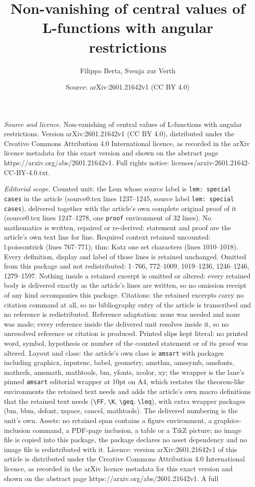 \documentclass[10pt,a4paper]{amsart}
\title[Non-vanishing of central values of L-functions with angular ]{Non-vanishing of central values of L-functions with angular restrictions}
\author{Filippo Berta, Svenja zur Verth}
\date{Source: arXiv:2601.21642v1 (CC BY 4.0)}
\begin{document}
\maketitle

\noindent\emph{Source and licence.} Non-vanishing of central values of L-functions with angular restrictions. Version arXiv:2601.21642v1 (CC BY 4.0), distributed under the Creative Commons Attribution 4.0 International licence, as recorded in the arXiv licence metadata for this exact version and shown on the abstract page https://arxiv.org/abs/2601.21642v1. Full rights notice: licenses/arxiv-2601.21642-CC-BY-4.0.txt.\par\smallskip

\noindent\textit{Editorial scope.} Counted unit: the Lem whose source label is \texttt{lem: special cases} in the article (source0.tex lines 1237--1245, source label \texttt{lem: special cases}), delivered together with the article's own complete original proof of it (source0.tex lines 1247--1278, one \texttt{proof} environment of 32 lines). No mathematics is written, repaired or re-derived: statement and proof are the article's own text line for line. Required context retained uncounted: l:poissontrick (lines 767--771); thm: Katz one set characters (lines 1010--1018). Every definition, display and label of those lines is retained unchanged. Omitted from this package and not redistributed: 1--766, 772--1009, 1019--1236, 1246--1246, 1279--1597. Nothing inside a retained excerpt is omitted or altered: every retained body is delivered exactly as the article's lines are written, so no omission receipt of any kind accompanies this package. Citations: the retained excerpts carry no citation command at all, so no bibliography entry of the article is transcribed and no reference is redistributed. Reference adaptation: none was needed and none was made; every reference inside the delivered unit resolves inside it, so no unresolved reference or citation is produced. Printed slips kept literal: no printed word, symbol, hypothesis or number of the counted statement or of its proof was altered. Layout and class: the article's own class is \texttt{amsart} with packages including graphicx, inputenc, babel, geometry, amsthm, amssymb, amsfonts, mathrsfs, amsmath, mathtools, bm, yfonts, xcolor, xy; the wrapper is the lane's pinned \texttt{amsart} editorial wrapper at 10pt on A4, which restates the theorem-like environments the retained text needs and adds the article's own macro definitions that the retained text needs (\texttt{\textbackslash FF}, \texttt{\textbackslash K}, \texttt{\textbackslash geq}, \texttt{\textbackslash leq}), with extra wrapper packages (bm, bbm, dsfont, xspace, cancel, mathtools). The delivered numbering is the unit's own. Assets: no retained span contains a figure environment, a graphics-inclusion command, a PDF-page inclusion, a table or a TikZ picture; no image file is copied into this package, the package declares no asset dependency and no image file is redistributed with it. Licence: version arXiv:2601.21642v1 of this article is distributed under the Creative Commons Attribution 4.0 International licence, as recorded in the arXiv licence metadata for this exact version and shown on the abstract page https://arxiv.org/abs/2601.21642v1. A full 
\end{document}
